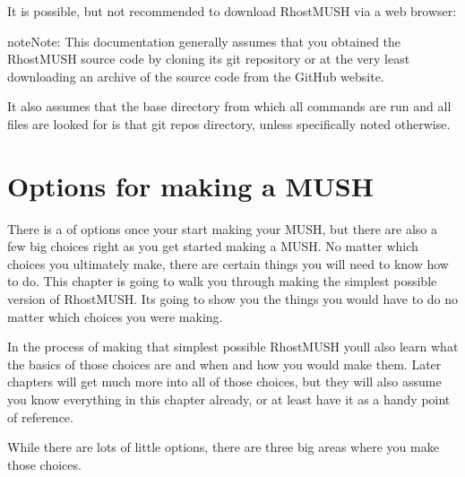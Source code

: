 \documentclass[letterpaper,10pt,english]{sphinxmanual}
\begin{document}
\sphinxAtStartPar
It is possible, but not recommended to download RhostMUSH via a web browser:

\begin{sphinxVerbatim}[commandchars=\\\{\}]
\end{sphinxVerbatim}

\begin{sphinxadmonition}{note}{Note:}
\sphinxAtStartPar
This documentation generally assumes that you obtained the RhostMUSH source
code by cloning it\textquotesingle{}s git repository or at the very least downloading an
archive of the source code from the GitHub website.

\sphinxAtStartPar
It also assumes that the base directory from which all commands are run
and all files are looked for is that git repo\textquotesingle{}s  directory,
unless specifically noted otherwise.
\end{sphinxadmonition}


\section{Options for making a MUSH}
\label{\detokenize{install:options-for-making-a-mush}}
\sphinxAtStartPar
There is a  of options once your start making your MUSH, but there are
also a few big choices right as you get started making a MUSH. No matter which
choices you ultimately make, there are certain things you will need to know how
to do. This chapter is going to walk you through making the simplest possible
version of RhostMUSH. It\textquotesingle{}s going to show you the things you would have to do
no matter which choices you were making.

\sphinxAtStartPar
In the process of making that simplest possible RhostMUSH you\textquotesingle{}ll also learn
what the basics of those choices are and when and how you would make them.
Later chapters will get much more into all of those choices, but they will also
assume you know everything in this chapter already, or at least have it as a
handy point of reference.

\sphinxAtStartPar
While there are lots of little options, there are three big areas where you
make those choices.
\end{document}

